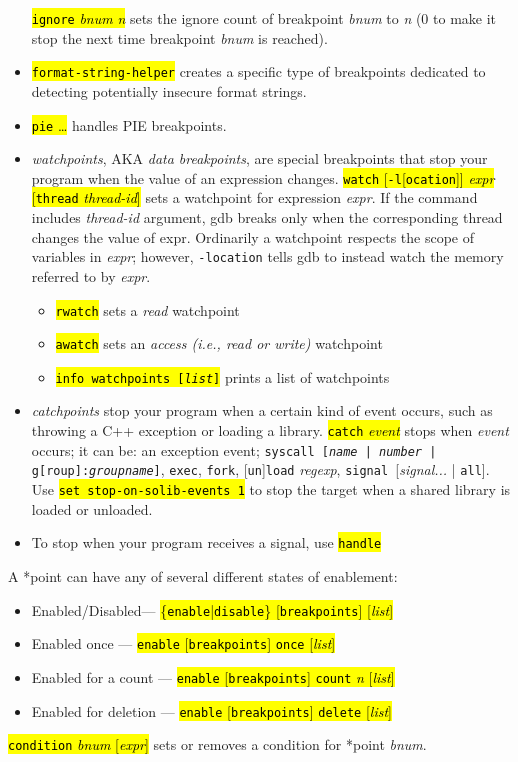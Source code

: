\documentclass[a4paper,landscape]{article}
\newcommand{\hlc}[2][yellow]{{\sethlcolor{#1} \hl{#2}}}
\newcommand{\gef}[1]{\hlc[skyblue]{#1}}
\begin{document}
\begin{multicols*}{3}
\begin{itemize}
\hl{\texttt{ignore} \textit{bnum} \textit{n}} sets the ignore count of breakpoint \textit{bnum} to \textit{n} (0 to make it stop the next time breakpoint \textit{bnum} is reached).
\item \gef{\texttt{format-string-helper}} creates a specific type of breakpoints dedicated to detecting potentially insecure format strings. %
\item \gef{\texttt{pie} \ldots} handles PIE breakpoints.
\item \emph{watchpoints}, AKA \emph{data breakpoints}, are special breakpoints that stop your program when the value of an expression changes.
	\hl{\texttt{watch} [\texttt{-l}[\texttt{ocation}]] \textit{expr} [\texttt{thread} \textit{thread-id}]} sets a watchpoint for expression \textit{expr}.
If the command includes \textit{thread-id} argument, gdb breaks only
when the corresponding thread changes the value of expr.
Ordinarily a watchpoint respects the scope of variables in \textit{expr}; however,
\texttt{-location} tells gdb to instead watch the memory referred to
by \textit{expr}.
	\begin{itemize}
	\item \hl{\texttt{rwatch}} sets a \emph{read} watchpoint
	\item \hl{\texttt{awatch}} sets an \emph{access (i.e., read or write)} watchpoint
	\item \hl{\texttt{info watchpoints [\textit{list}]}} prints a list of watchpoints
	\end{itemize}
\item \emph{catchpoints} stop your program when a certain kind
of event occurs, such as throwing a C++ exception or loading a library.
\hl{\texttt{catch} \textit{event}} stops when \textit{event} occurs; it can be:
an exception event;
\texttt{syscall [\textit{name} | \textit{number} | \texttt{g}[\texttt{roup}]:\textit{groupname}]},
\texttt{exec}, \texttt{fork},
[\texttt{un}]\texttt{load} \textit{regexp}, \texttt{signal }[\textit{signal...} | \texttt{all}].
Use \hl{\texttt{set stop-on-solib-events 1}} to stop the target when a shared library is loaded or unloaded.
\item To stop when your program receives a signal, use \hl{\texttt{handle}}
\end{itemize}
A *point can have any of several different states of enablement:
\begin{itemize}
\item Enabled/Disabled--- \hl{\{\texttt{enable}|\texttt{disable}\} [\texttt{breakpoints}] [\textit{list}]}
\item Enabled once --- \hl{\texttt{enable} [\texttt{breakpoints}] \texttt{once} [\textit{list}]}
\item Enabled for a count --- \hl{\texttt{enable} [\texttt{breakpoints}] \texttt{count} \textit{n} [\textit{list}]}
\item Enabled for deletion --- \hl{\texttt{enable} [\texttt{breakpoints}] \texttt{delete} [\textit{list}]}
\end{itemize}
\hl{\texttt{condition} \textit{bnum} [\textit{expr}]} sets or removes a condition for *point \textit{bnum}.


\end{multicols*}
\end{document}
